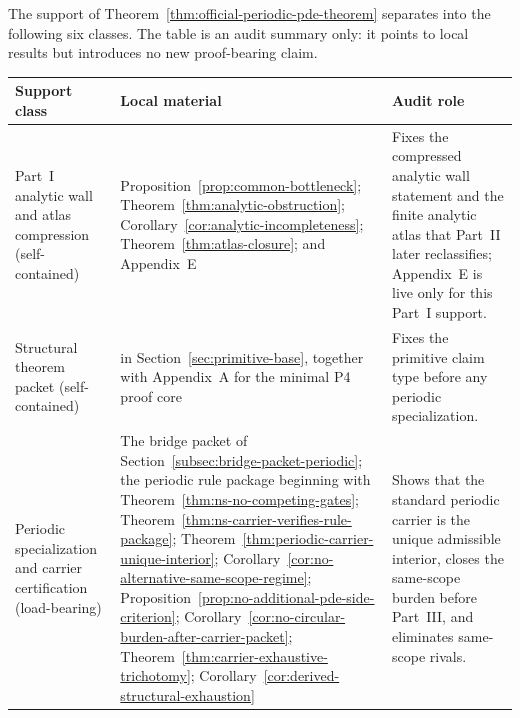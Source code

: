\begin{proposition}\label{prop:three-level-support-ledger}
The support of Theorem~\ref{thm:official-periodic-pde-theorem} separates into the following six classes. The table is an audit summary only: it points to local results but introduces no new proof-bearing claim.
\begin{center}
\small
\renewcommand{\arraystretch}{1.14}
\setlength{\tabcolsep}{4pt}
\begin{tabularx}{0.98\textwidth}{@{}L{0.22\textwidth}L{0.39\textwidth}Y@{}}
\toprule
\textbf{Support class} & \textbf{Local material} & \textbf{Audit role}\\
\midrule
Part~I analytic wall and atlas compression (self-contained) & Proposition~\ref{prop:common-bottleneck}; Theorem~\ref{thm:analytic-obstruction}; Corollary~\ref{cor:analytic-incompleteness}; Theorem~\ref{thm:atlas-closure}; and Appendix~E & Fixes the compressed analytic wall statement and the finite analytic atlas that Part~II later reclassifies; Appendix~E is live only for this Part~I support.\\
Structural theorem packet (self-contained) & \StructuralPacketRef{} in Section~\ref{sec:primitive-base}, together with Appendix~A for the minimal P4 proof core & Fixes the primitive claim type before any periodic specialization.\\
Periodic specialization and carrier certification (load-bearing) & The bridge packet of Section~\ref{subsec:bridge-packet-periodic}; the periodic rule package beginning with Theorem~\ref{thm:ns-no-competing-gates}; Theorem~\ref{thm:ns-carrier-verifies-rule-package}; Theorem~\ref{thm:periodic-carrier-unique-interior}; Corollary~\ref{cor:no-alternative-same-scope-regime}; Proposition~\ref{prop:no-additional-pde-side-criterion}; Corollary~\ref{cor:no-circular-burden-after-carrier-packet}; Theorem~\ref{thm:carrier-exhaustive-trichotomy}; Corollary~\ref{cor:derived-structural-exhaustion} & Shows that the standard periodic carrier is the unique admissible interior, closes the same-scope burden before Part~III, and eliminates same-scope rivals.\\

\end{tabularx}
\end{center}
\end{proposition}

